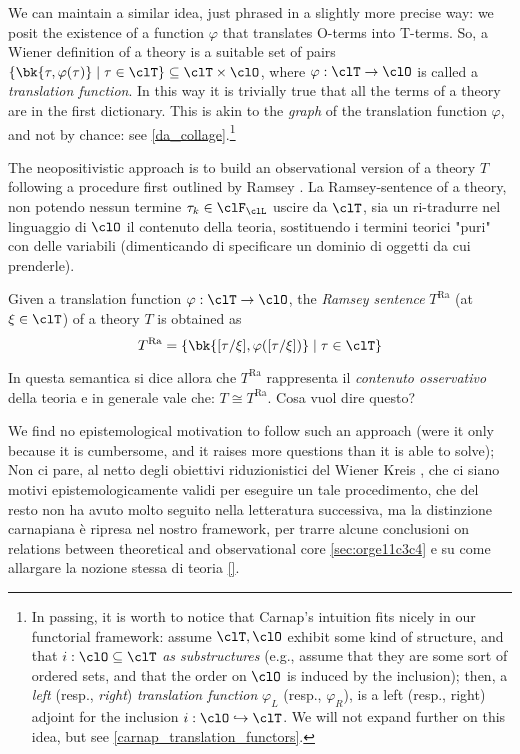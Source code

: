 We can maintain a similar idea, just phrased in a slightly more precise way: we posit the existence of a function $\varphi$ that translates O-terms into T-terms. So, a Wiener definition of a theory is a suitable set of pairs $\{\bk{\tau,\varphi(\tau)} \mid \tau\in\clT\}\subseteq \clT\times\clO$, where $\varphi: \clT \to \clO$ is called a \emph{translation function}. In this way it is trivially true that all the terms of a theory are in the first dictionary. This is akin to the \emph{graph} of the translation function $\varphi$, and not by chance: see \autoref{da_collage}.\footnote{In passing, it is worth to notice that Carnap's intuition fits nicely in our functorial framework: assume $\clT, \clO$ exhibit some kind of structure, and that $i : \clO\subseteq\clT$ \emph{as substructures} (e.g., assume that they are some sort of ordered sets, and that the order on $\clO$ is induced by the inclusion); then, a \emph{left} (resp., \emph{right}) \emph{translation function} $\varphi_L$ (resp., $\varphi_R$), is a left (resp., right) adjoint for the inclusion $i : \clO\hookrightarrow \clT$. We will not expand further on this idea, but see \autoref{carnap_translation_functors}.}

The neopositivistic approach is to build an observational version of a theory $T$ following a procedure first outlined by Ramsey \cite{?}. La Ramsey-sentence of a theory, non potendo nessun termine $\tau_k \in \clF_\clL$ uscire da $\clT$, sia un ri-tradurre nel linguaggio di $\clO$ il contenuto della teoria, sostituendo i termini teorici "puri" con delle variabili (dimenticando di specificare un dominio di oggetti da cui prenderle).
\begin{definition} 
	Given a translation function $\varphi: \clT \to \clO$, the \emph{Ramsey sentence} $T^\text{Ra}$ (at $\xi\in\clT$) of a theory $T$ is obtained as
	\[
		T^\text{Ra} = \{\bk{[\tau/\xi], \varphi([\tau/\xi])} \mid \tau\in\clT\}
	\]
\end{definition}
In questa semantica si dice allora che $T^\text{Ra}$ rappresenta il \emph{contenuto osservativo} della teoria e in generale vale che: $T \cong T^\text{Ra}$.
	{\color{red} Cosa vuol dire questo?}

\medskip
We find no epistemological motivation to follow such an approach (were it only because it is cumbersome, and it raises more questions than it is able to solve);  Non ci pare, al netto degli obiettivi riduzionistici del Wiener Kreis \cite{}, che ci siano motivi epistemologicamente validi per eseguire un tale procedimento, che del resto non ha avuto molto seguito nella letteratura successiva, ma la distinzione carnapiana è ripresa nel nostro framework, per trarre alcune conclusioni on relations between theoretical and observational core \autoref{sec:orge11c3c4} e su come allargare la nozione stessa di teoria \autoref{}.

